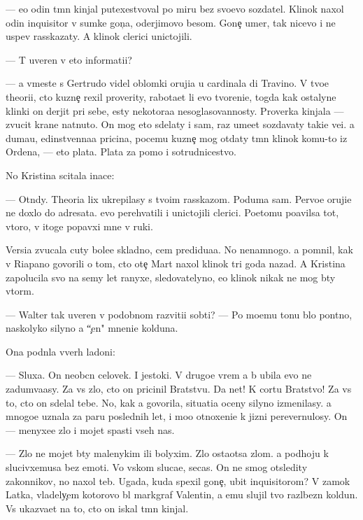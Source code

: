 \documentclass[10pt]{book}
\begin{document}
— {\Y}e{\x}o odin t{\e}mn{\yi}{\y} kinjal putexestvoval po miru bez svo{\y}evo sozdatel{\ia}. Klinok naxol odin inquisitor v sumke gon{\c}a, oderjimovo besom. Gone{\c} umer, tak nicevo i ne uspev rasskazaty. A klinok clerici unictojili.

— T{\yi} uveren v eto{\y} informati{\y}i?

— {\Y}a vmeste s Gertrudo{\y} videl oblomki oruji{\y}a u cardinala di Travino. V tvo{\y}e{\y} theori{\y}i, cto kuzne{\c} rexil proverity, rabota{\y}et li {\y}evo tvoreni{\y}e, togda kak ostalyn{\yi}{\y}e klinki on derjit pri sebe, {\y}esty nekotora{\y}a nesoglasovannosty. Proverka kinjala — zvucit kra{\y}ne nat{\ia}nuto. On mog eto sdelaty i sam, raz ume{\y}et sozdavaty taki{\y}e ve{\x}i. {\Y}a duma{\y}u, {\y}edinstvenna{\y}a pricina, pocemu kuzne{\c} mog otdaty t{\e}mn{\yi}{\y} klinok komu-to iz Ordena, — eto plata. Plata za pomo{\x} i sotrudnicestvo.

No Kristina scitala inace:

— Otn{\io}dy. Theori{\y}a lix ukrepilasy s tvo{\y}im rasskazom. Poduma{\y} sam. Pervo{\y}e oruji{\y}e ne doxlo do adresata. {\Y}evo perehvatili i unictojili clerici. Poetomu po{\y}avilsa tot, vtoro{\y}, v itoge popavxi{\y} mne v ruki.

Versi{\y}a zvucala cuty bole{\y}e skladno, cem predidu{\x}a{\y}a. No nenamnogo. {\Y}a pomnil, kak v Riapano govorili o tom, cto ote{\c} Mart naxol klinok tri goda nazad. A Kristina zapolucila svo{\y} na semy let ranyxe, sledovatelyno, {\y}e{\y}o klinok nikak ne mog b{\yi}ty vtor{\yi}m.

— Walter tak uveren v podobnom razviti{\y}i sob{\yi}ti{\y}? — Po mo{\y}emu tonu b{\yi}lo pon{\ia}tno, naskolyko silyno {\y}a ``{\c}en{\io}" mneni{\y}e kolduna.

Ona podn{\ia}la vverh ladoni:

— Sluxa{\y}. On neob{\yi}cn{\yi}{\y} celovek. I jestoki{\y}. V drugo{\y}e vrem{\ia} {\y}a b{\yi} ubila {\y}evo ne zadum{\yi}va{\y}asy. Za vs{\e} zlo, cto on pricinil Bratstvu. Da net! K cortu Bratstvo! Za vs{\e} to, cto on sdelal tebe. No, kak {\y}a govorila, situati{\y}a oceny silyno izmenilasy. {\Y}a mnogo{\y}e uznala za paru poslednih let, i mo{\y}o otnoxeni{\y}e k jizni perevernulosy. On — menyxe{\y}e zlo i mojet spasti vseh nas.

— Zlo ne mojet b{\yi}ty malenykim ili bolyxim. Zlo osta{\y}otsa zlom. {\Y}a podhoju k slucivxemusa bez emoti{\y}. Vo vs{\ia}kom sluca{\y}e, se{\y}cas. On ne smog otsledity zakonnikov, no naxol teb{\ia}. Ugada{\y}, kuda spexil gone{\c}, ubit{\yi}{\y} inquisitorom? V zamok Latka, vladely{\c}em kotorovo b{\yi}l markgraf Valentin, a {\y}emu slujil tvo{\y} razl{\io}bezn{\yi}{\y} koldun. Vs{\e} ukaz{\yi}va{\y}et na to, cto on iskal t{\e}mn{\yi}{\y} kinjal.
\end{document}
